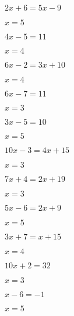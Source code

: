 \documentclass{ximera}
\begin{document}
\begin{exercise}
\begin{xmmulticols}
  \begin{question} \( 2x + 6  =  5x - 9     \) \begin{oplossing} \( x  = 5  \) \end{oplossing} \end{question}
  \begin{question} \( 4x - 5  =  11         \) \begin{oplossing} \( x  = 4  \) \end{oplossing} \end{question}
  \begin{question} \( 6x - 2  =  3x + 10    \) \begin{oplossing} \( x  = 4  \) \end{oplossing} \end{question}
  \begin{question} \( 6x - 7  =  11         \) \begin{oplossing} \( x  = 3  \) \end{oplossing} \end{question}
  \begin{question} \( 3x - 5  =  10         \) \begin{oplossing} \( x  = 5  \) \end{oplossing} \end{question}
  \begin{question} \( 10x - 3 =  4x + 15    \) \begin{oplossing} \( x  = 3  \) \end{oplossing} \end{question}
  \begin{question} \( 7x + 4  =  2x + 19    \) \begin{oplossing} \( x  = 3  \) \end{oplossing} \end{question}
  \begin{question} \( 5x - 6  =  2x + 9     \) \begin{oplossing} \( x  = 5  \) \end{oplossing} \end{question}
  \begin{question} \( 3x + 7  =  x + 15     \) \begin{oplossing} \( x  = 4  \) \end{oplossing} \end{question}
  \begin{question} \( 10x + 2 =  32         \) \begin{oplossing} \( x  = 3  \) \end{oplossing} \end{question}
  \begin{question} \( x - 6   =  -1         \) \begin{oplossing} \( x  = 5  \) \end{oplossing} \end{question}

\end{xmmulticols}
\end{exercise}
\end{document}
